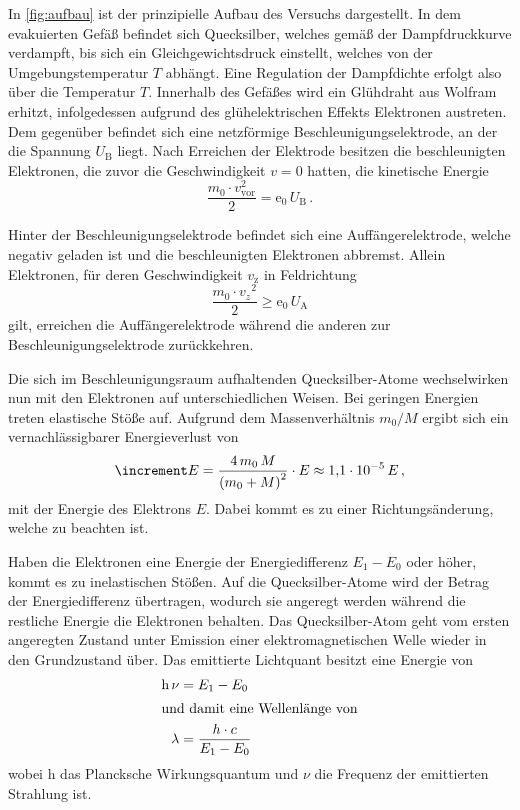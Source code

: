 In \autoref{fig:aufbau} ist der prinzipielle Aufbau des Versuchs dargestellt.
In dem evakuierten Gefäß befindet sich Quecksilber, welches gemäß der Dampfdruckkurve verdampft,
bis sich ein Gleichgewichtsdruck einstellt, welches von der Umgebungstemperatur $T$ abhängt.
Eine Regulation der Dampfdichte erfolgt also über die Temperatur $T$.
Innerhalb des Gefäßes wird ein Glühdraht aus Wolfram erhitzt, 
infolgedessen aufgrund des glühelektrischen Effekts Elektronen austreten.
Dem gegenüber befindet sich eine netzförmige Beschleunigungselektrode, an der die Spannung $U_\text{B}$ liegt.
Nach Erreichen der Elektrode besitzen die beschleunigten Elektronen, die zuvor die Geschwindigkeit $v = 0$ hatten, die kinetische Energie
\begin{equation}
    \frac{m_{0} \cdot v_{\mathrm{vor}}^{2}}{2} = \mathrm{e}_{0} \, U_{\mathrm{B}} \, .
\end{equation}

Hinter der Beschleunigungselektrode befindet sich eine Auffängerelektrode, 
welche negativ geladen ist und die beschleunigten Elektronen abbremst.
Allein Elektronen, für deren Geschwindigkeit $v_\text{z}$ in Feldrichtung
\begin{equation}
    \frac{m_{0} \cdot v_{z}{ }^{2}}{2}  \geq \mathrm{e}_{0} \, U_{\mathrm{A}}
\end{equation}
gilt, erreichen die Auffängerelektrode während die anderen zur Beschleunigungselektrode zurückkehren.

Die sich im Beschleunigungsraum aufhaltenden Quecksilber-Atome wechselwirken nun mit den Elektronen auf unterschiedlichen Weisen.
Bei geringen Energien treten elastische Stöße auf. 
Aufgrund dem Massenverhältnis $m_0/M$ ergibt sich ein vernachlässigbarer Energieverlust von
\begin{equation}
    \increment E=\frac{4 \, m_{0} \, M}{\left(m_{0}+M\right)^{2}} \cdot E \approx \num{1.1e{-5}} \, E \, ,
\end{equation}
mit der Energie des Elektrons $E$. 
Dabei kommt es zu einer Richtungsänderung, welche zu beachten ist.

Haben die Elektronen eine Energie der Energiedifferenz $E_1 - E_0$ oder höher, kommt es zu inelastischen Stößen.
Auf die Quecksilber-Atome wird der Betrag der Energiedifferenz übertragen, wodurch sie angeregt werden während die restliche Energie die Elektronen behalten. 
Das Quecksilber-Atom geht vom ersten angeregten Zustand unter Emission einer elektromagnetischen Welle wieder in den Grundzustand über. 
Das emittierte Lichtquant besitzt eine Energie von
\begin{align}
    \text{h} \, \nu &= E_1 - E_0 \\
    \intertext{und damit eine Wellenlänge von}
    \lambda &= \frac{h \cdot c}{E_1 - E_0} \label{eq:lambda}
\end{align}
wobei h das Plancksche Wirkungsquantum und $\nu$ die Frequenz der emittierten Strahlung ist.

